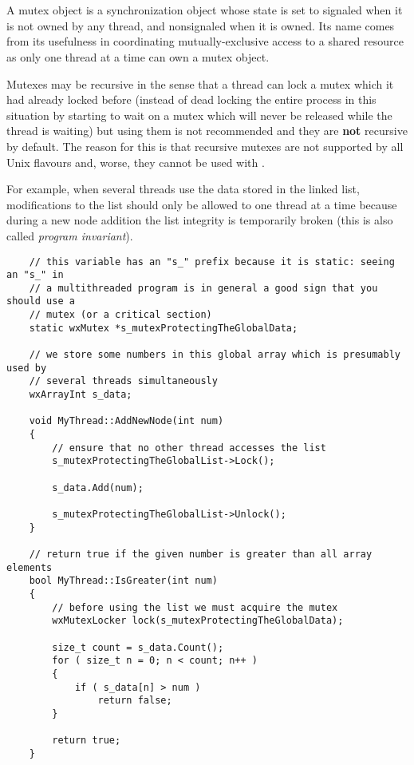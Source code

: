 \section{}\label{wxmutex}

A mutex object is a synchronization object whose state is set to signaled when
it is not owned by any thread, and nonsignaled when it is owned. Its name comes
from its usefulness in coordinating mutually-exclusive access to a shared
resource as only one thread at a time can own a mutex object.

Mutexes may be recursive in the sense that a thread can lock a mutex which it
had already locked before (instead of dead locking the entire process in this
situation by starting to wait on a mutex which will never be released while the
thread is waiting) but using them is not recommended and they are {\bf not}
recursive by default. The reason for this is that recursive mutexes are not
supported by all Unix flavours and, worse, they cannot be used with 
.

For example, when several threads use the data stored in the linked list,
modifications to the list should only be allowed to one thread at a time
because during a new node addition the list integrity is temporarily broken
(this is also called {\it program invariant}).


{\small%
\begin{verbatim}
    // this variable has an "s_" prefix because it is static: seeing an "s_" in
    // a multithreaded program is in general a good sign that you should use a
    // mutex (or a critical section)
    static wxMutex *s_mutexProtectingTheGlobalData;

    // we store some numbers in this global array which is presumably used by
    // several threads simultaneously
    wxArrayInt s_data;

    void MyThread::AddNewNode(int num)
    {
        // ensure that no other thread accesses the list
        s_mutexProtectingTheGlobalList->Lock();

        s_data.Add(num);

        s_mutexProtectingTheGlobalList->Unlock();
    }

    // return true if the given number is greater than all array elements
    bool MyThread::IsGreater(int num)
    {
        // before using the list we must acquire the mutex
        wxMutexLocker lock(s_mutexProtectingTheGlobalData);

        size_t count = s_data.Count();
        for ( size_t n = 0; n < count; n++ )
        {
            if ( s_data[n] > num )
                return false;
        }

        return true;
    }
\end{verbatim}
}

